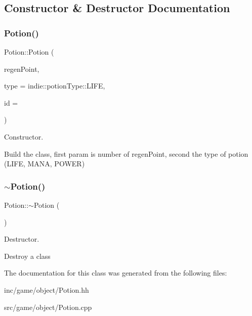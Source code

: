 \subsection{Constructor \& Destructor Documentation}
\mbox{\label{classPotion_a2fae017a2dbe6fd82269d19a51908959}} 
\subsubsection{\texorpdfstring{Potion()}{Potion()}}
{\footnotesize\ttfamily Potion\+::\+Potion (\begin{DoxyParamCaption}\item[{irr\+::s32}]{regen\+Point,  }\item[{indie\+::potion\+Type}]{type = {\ttfamily indie\+:\+:potionType\+:\+:LIFE},  }\item[{irr\+::u32}]{id = {} }\end{DoxyParamCaption})}



Constructor. 

Build the class, first param is number of regen\+Point, second the type of potion (L\+I\+FE, M\+A\+NA, P\+O\+W\+ER) \mbox{\label{classPotion_a8730c8052ec698171885bb5dacda9cca}} 
\subsubsection{\texorpdfstring{$\sim$\+Potion()}{~Potion()}}
{\footnotesize\ttfamily Potion\+::$\sim$\+Potion (\begin{DoxyParamCaption}{ }\end{DoxyParamCaption})}



Destructor. 

Destroy a class 

The documentation for this class was generated from the following files\+:\begin{DoxyCompactItemize}
\item 
inc/game/object/Potion.\+hh\item 
src/game/object/Potion.\+cpp\end{DoxyCompactItemize}
